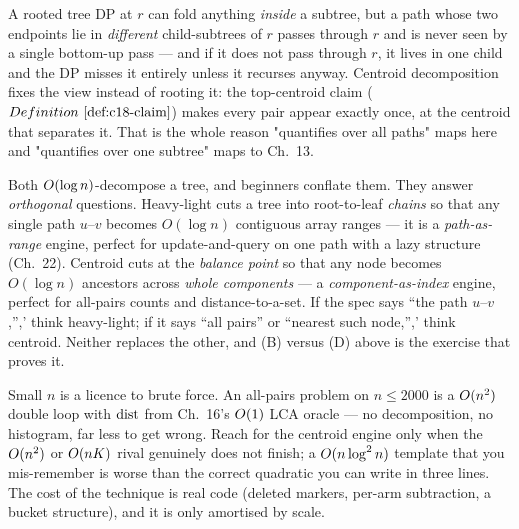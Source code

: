 \begin{observation}
A rooted tree DP at \(r\) can fold anything \emph{inside} a subtree, but a path whose two
endpoints lie in \emph{different} child-subtrees of \(r\) passes through \(r\) and is never
seen by a single bottom-up pass --- and if it does not pass through \(r\), it lives in one
child and the DP misses it entirely unless it recurses anyway. Centroid decomposition
fixes the view instead of rooting it: the top-centroid claim (\(\defref{c18-claim}\)) makes
every pair appear exactly once, at the centroid that separates it. That is the whole reason
"quantifies over all paths" maps here and "quantifies over one subtree" maps to Ch.~13.
\end{observation}

\begin{notebox}
Both \(O(\log n)\)-decompose a tree, and beginners conflate them. They answer
\emph{orthogonal} questions. Heavy-light cuts a tree into root-to-leaf \emph{chains} so
that any single path \(u\)--\(v\) becomes \(O(\log n)\) contiguous array ranges --- it is a
\emph{path-as-range} engine, perfect for update-and-query on one path with a lazy
structure (Ch.~22). Centroid cuts at the \emph{balance point} so that any node becomes
\(O(\log n)\) ancestors across \emph{whole components} --- a \emph{component-as-index}
engine, perfect for all-pairs counts and distance-to-a-set. If the spec says ``the path
\(u\)--\(v\),'',' think heavy-light; if it says ``all pairs'' or ``nearest such node,'','
think centroid. Neither replaces the other, and (B) versus (D) above is the exercise that
proves it.
\end{notebox}

\begin{stuckbox}
Small \(n\) is a licence to brute force. An all-pairs problem on \(n\le2000\) is a
\(O(n^2)\) double loop with \(\operatorname{dist}\) from Ch.~16's \(O(1)\) LCA oracle --- no
decomposition, no histogram, far less to get wrong. Reach for the centroid engine only when
the \(O(n^2)\) or \(O(nK)\) rival genuinely does not finish; a \(O(n\log^2 n)\)
template that you mis-remember is worse than the correct quadratic you can write in three
lines. The cost of the technique is real code (deleted markers, per-arm subtraction, a
bucket structure), and it is only amortised by scale.
\end{stuckbox}

